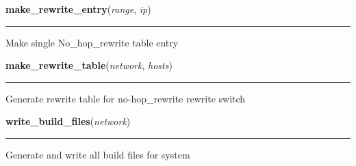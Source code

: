     \label{initialize_system:Write_Jsons:make_rewrite_entry}

    \vspace{0.5ex}

\hspace{.8\funcindent}\begin{boxedminipage}{\funcwidth}

    \raggedright \textbf{make\_rewrite\_entry}(\textit{range}, \textit{ip})

    \vspace{-1.5ex}

    \rule{\textwidth}{0.5\fboxrule}
\setlength{\parskip}{2ex}
    Make single No\_hop\_rewrite table entry

\setlength{\parskip}{1ex}
    \end{boxedminipage}

    \label{initialize_system:Write_Jsons:make_rewrite_table}

    \vspace{0.5ex}

\hspace{.8\funcindent}\begin{boxedminipage}{\funcwidth}

    \raggedright \textbf{make\_rewrite\_table}(\textit{network}, \textit{hosts})

    \vspace{-1.5ex}

    \rule{\textwidth}{0.5\fboxrule}
\setlength{\parskip}{2ex}
    Generate rewrite table for no-hop\_rewrite rewrite switch

\setlength{\parskip}{1ex}
    \end{boxedminipage}

    \label{initialize_system:Write_Jsons:write_build_files}

    \vspace{0.5ex}

\hspace{.8\funcindent}\begin{boxedminipage}{\funcwidth}

    \raggedright \textbf{write\_build\_files}(\textit{network})

    \vspace{-1.5ex}

    \rule{\textwidth}{0.5\fboxrule}
\setlength{\parskip}{2ex}
    Generate and write all build files for system

\setlength{\parskip}{1ex}
    \end{boxedminipage}

